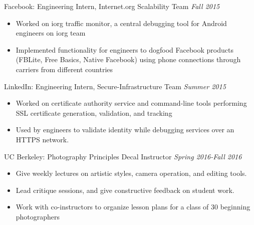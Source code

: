 \documentclass[line,mm]{res}
\begin{document}
\begin{resume}
    {\sc Facebook:} Engineering Intern, Internet.org Scalability Team \hfill {\sl Fall 2015}
    \begin{itemize} \itemsep -2pt
    \item Worked on iorg traffic monitor, a central debugging tool for Android engineers on iorg team
    \item Implemented functionality for engineers to dogfood Facebook products (FBLite, Free Basics, Native Facebook) using phone connections through carriers from different countries
    \end{itemize}
    {\sc LinkedIn:} Engineering Intern, Secure-Infrastructure Team \hfill {\sl Summer 2015}
    \begin{itemize} \itemsep -2pt
    \item Worked on certificate authority service and command-line tools performing SSL certificate generation, validation, and tracking
    \item Used by engineers to validate identity while debugging services over an HTTPS network.
    \end{itemize}
    {\sc UC Berkeley:} Photography Principles Decal Instructor \hfill {\sl Spring 2016-Fall 2016}
    \begin{itemize} \itemsep -2pt
    \item Give weekly lectures on artistic styles, camera operation, and editing tools.
    \item Lead critique sessions, and give constructive feedback on student work.
    \item Work with co-instructors to organize lesson plans for a class of 30 beginning photographers
    \end{itemize}
\iffalse
    {\sc UC Berkeley:} CS 70, Math 54 Reader  \hfill {\sl Summer 2013 - Fall 2014}
    \begin{itemize} \itemsep -2pt
    \item Graded exams and problem sets for classes in Discrete Math and Linear Algebra.
    \item Prepared worksheets and led a review session before finals
    \end{itemize}
   \fi 

\end{resume}
\end{document}
